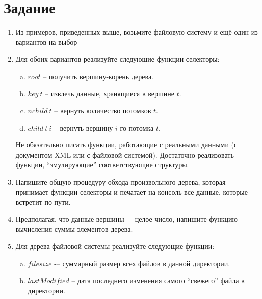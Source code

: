 \documentclass[a4paper,11pt]{article}
\begin{document}
\section{Задание}
\begin{enumerate}
\item Из примеров, приведенных выше, возьмите файловую систему и ещё один из
  вариантов на выбор
\item Для обоих вариантов реализуйте следующие функции-селекторы:
  \begin{enumerate}[(a)]
  \item $root$ -- получить вершину-корень дерева.
  \item $key~t$ -- извлечь данные, хранящиеся в вершине $t$.
  \item $nchild~t$ -- вернуть количество потомков $t$.
  \item $child~t~i$ -- вернуть вершину-$i$-го потомка $t$.
  \end{enumerate}
  Не обязательно писать функции, работающие с реальными данными (с документом XML
  или с файловой системой). Достаточно реализовать функции, ``эмулирующие''
  соответствующие структуры.
\item Напишите общую процедуру обхода произвольного дерева, которая принимает
  функции-селекторы и печатает на консоль все данные, которые встретит по пути.
\item Предполагая, что данные вершины -– целое число, напишите функцию вычисления
  суммы элементов дерева.
\item Для дерева файловой системы реализуйте следующие функции:
  \begin{enumerate}[(a)]
  \item $filesize$ -– суммарный размер всех файлов в данной директории.
  \item $lastModified$ -- дата последнего изменения самого ``свежего'' файла
    в директории.
  \end{enumerate}
\end{enumerate}
\end{document}
